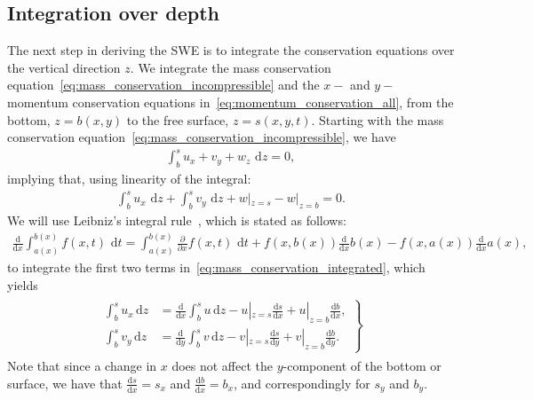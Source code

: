 \subsection{Integration over depth}
The next step in deriving the SWE is to integrate the conservation equations over the vertical direction $z$.
We integrate the mass conservation equation~\eqref{eq:mass_conservation_incompressible} and the $x-$ and $y-$momentum conservation equations in~\eqref{eq:momentum_conservation_all}, from the bottom, $z = b(x,y)$ to the free surface, $z = s(x,y,t)$.
Starting with the mass conservation equation~\eqref{eq:mass_conservation_incompressible}, we have
\begin{align*}
    \int_{b}^{s} u_x + v_y + w_z \text{ d} z = 0,
\end{align*}
implying that, using linearity of the integral:
\begin{align}\label{eq:mass_conservation_integrated}
    \int_{b}^{s} u_x \text{ d} z + \int_{b}^{s} v_y \text{ d} z  + w|_{z = s} - w|_{z = b} = 0.
\end{align}
We will use Leibniz's integral rule~\cite{Leibniz}, which is stated as follows:
\begin{align}\label{eq:leibniz_rule}
    \frac{\text{d}}{\text{d} x} \int_{a(x)}^{b(x)} f(x,t) \text{ d} t
    = \int_{a(x)}^{b(x)} \frac{\partial }{\partial x} f(x, t) \text{ d} t + f(x, b(x)) \frac{\text{d}}{\text{d} x} b(x) - f(x, a(x)) \frac{\text{d}}{\text{d} x} a(x),
\end{align}
to integrate the first two terms in~\eqref{eq:mass_conservation_integrated}, which yields
\begin{align}\label{eq:leibniz_rule_applied}
    \begin{gathered}
        \left.
        \begin{aligned}
        \int_{b}^{s} u_x \, \text{d} z &=  \frac{\text{d}}{\text{d} x}  \int_{b}^{s} u \, \text{d} z  - u|_{z = s} \frac{\text{d} s}{\text{d} x} + u|_{z = b} \frac{\text{d} b}{\text{d} x}, \\
        \int_{b}^{s} v_y \, \text{d} z &=  \frac{\text{d}}{\text{d} y}  \int_{b}^{s} v \, \text{d} z  - v|_{z = s} \frac{\text{d} s}{\text{d} y} + v|_{z = b} \frac{\text{d} b}{\text{d} y}.
        \end{aligned}
        \right\}
    \end{gathered}
\end{align}
Note that since a change in $x$ does not affect the $y$-component of the bottom or surface, we have that $\frac{\text{d} s}{\text{d} x} = s_x$ and $ \frac{\text{d} b}{\text{d} x} = b_x$, and correspondingly for $s_y$ and $b_y$.
